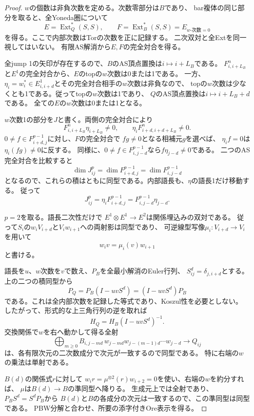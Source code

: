 \documentclass[11pt,a4paper]{ltjsarticle}
\theoremstyle{definition}
\begin{document}
\begin{proof}
$w$の個数は非負次数を定める。次数零部分は$B$であり、
bar複体の同じ部分を取ると、全Yoneda圏について
\[
E=\operatorname{Ext}_Q^*(S,S),\qquad
F=\operatorname{Ext}_B^*(S,S)=E_{w\text{-次数}=0}
\]
を得る。ここで内部次数はTorの次数を正に記録する。
二次双対と全Extを同一視してはいない。
有限AS解消から$E,F$の完全対合を得る。

全jump 1の矢印が存在するので、$B$のAS頂点置換は$i\mapsto i+L_B$である。
$F^n_{i,i+L_B}$と$E^1$の完全対合から、$E$のtopの$w$次数は0または1である。
一方、$\eta_i=w_i^*\in E^1_{i,i+d}$とその完全対合相手の$w$次数は非負なので、
topの$w$次数は少なくとも1である。従ってtopの$w$次数は1であり、
$Q$のAS頂点置換は$i\mapsto i+L_B+d$である。
全ての$E$の$w$次数は0または1となる。

$w$次数1の部分を$J$と書く。両側の完全対合により
\[
F^n_{i,i+L_B}\eta_{i+L_B}\ne0,\qquad
\eta_i F^n_{i+d,i+d+L_B}\ne0.
\]
$0\ne f\in F^{p-1}_{i+d,j}$に対し、$F$の完全対合で
$fg\ne0$となる相補元$g$を選べば、
$\eta_i f=0$は$\eta_i(fg)\ne0$に反する。
同様に、$0\ne f\in F^{p-1}_{i,j-d}$なら$f\eta_{j-d}\ne0$である。
二つのAS完全対合を比較すると
\[
\dim J^p_{ij}
=\dim F^{p-1}_{i+d,j}
=\dim F^{p-1}_{i,j-d}
\]
となるので、これらの積はともに同型である。内部語長も、$\eta$の語長1だけ移動する。
従って
\[
J^p_{ij}
=\eta_i F^{p-1}_{i+d,j}
=F^{p-1}_{i,j-d}\eta_{j-d}.
\]

$p=2$を取る。語長二次性だけで
$E^1\otimes E^1\to E^2$は関係埋込みの双対である。
従って$S_i$の$w_iV_{i+d}$と$V_iw_{i+1}$への両射影は同型であり、
可逆線型写像$\mu_i:V_{i+d}\to V_i$を用いて
\[
w_i v=\mu_i(v)w_{i+1}
\]
と書ける。

語長を$u$、$w$次数を$v$で数え、$P_B$を全最小解消のEuler行列、
$S^d_{ij}=\delta_{j,i+d}$とする。上の二つの積同型から
\[
P_Q=P_B(I-uvS^d)=(I-uvS^d)P_B
\]
である。これは全内部次数を記録した等式であり、Koszul性を必要としない。
したがって、形式的な上三角行列の逆を取れば
\[
H_Q=H_B(I-uvS^d)^{-1}.
\]
交換関係で$w$を右へ動かして得る全射
\[
\bigoplus_{m\ge0}
B_{i,j-md}\,w_{j-md}w_{j-(m-1)d}\cdots w_{j-d}
\longrightarrow Q_{ij}
\]
は、各有限次元の二次数成分で次元が一致するので同型である。
特に右端の$w$の乗法は単射である。

$B(d)$の関係式$r$に対して
$w_i r=\mu^{\otimes2}(r)w_{i+2}=0$を使い、右端の$w$を約分すれば、
$\mu$は$B(d)\to B$の準同型へ降りる。
生成元上では全射であり、$P_BS^d=S^dP_B$から
$B(d)$と$B$の各成分の次元は一致するので、この準同型は同型である。
PBW分解と合わせ、所要の添字付きOre表示を得る。
\end{proof}
\end{document}
